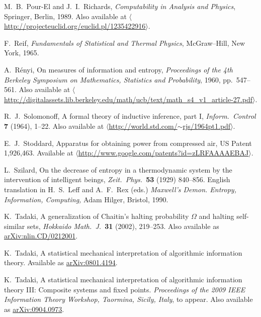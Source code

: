 \documentclass{article}
\begin{document}
\begin{thebibliography}{10}
 M.\ B.\ Pour-El and J.\ I.\ Richards,
\textsl{Computability in Analysis and Physics}, Springer, Berlin, 1989.
Also available at \href{http://projecteuclid.org/euclid.pl/1235422916}
{$\langle$http://projecteuclid.org/euclid.pl/1235422916$\rangle$}.

 F.\ Reif, {\sl Fundamentals of Statistical and
Thermal Physics}, McGraw--Hill, New York, 1965.

 A.\ R\'enyi, On measures of information and entropy,
\textsl{Proceedings of the 4th Berkeley Symposium on Mathematics, 
Statistics and Probability}, 1960, pp.\ 547--561.  Also 
available at
\href{http://digitalassets.lib.berkeley.edu/math/ucb/text/math_s4_v1_article-27.pdf}
{$\langle$http://digitalassets.lib.berkeley.edu/math/ucb/text/math\_s4\_v1\_article-27.pdf$\rangle$}.

 R.\ J.\ Solomonoff, A formal theory of
inductive inference, part I, {\sl Inform.\ Control} {\bf 7} (1964),
1--22.  Also available at 
\hfill \break
\href{http://world.std.com/~rjs/1964pt1.pdf}
{$\langle$http://world.std.com/$\sim$rjs/1964pt1.pdf$\rangle$}.

 E.\ J.\ Stoddard, Apparatus for obtaining 
power from compressed air, US Patent 1,926,463.  Available at 
\hfill \break
\href{http://www.google.com/patents?id=zLRFAAAAEBAJ}
{$\langle$http://www.google.com/patents?id=zLRFAAAAEBAJ$\rangle$}.

 L.\ Szilard, On the decrease of entropy in a
thermodynamic system by the intervention of intelligent beings,
\textsl{Zeit.\ Phys.\ }\textbf{53} (1929) 840--856.
English translation in H.\ S.\ Leff and A.\ F.\ Rex (eds.)
\textit{Maxwell's Demon. Entropy, Information, Computing,} 
Adam Hilger, Bristol, 1990.

 K.\ Tadaki, A generalization of Chaitin's
halting probability $\Omega$ and halting self-similar sets, {\sl
Hokkaido Math.\ J.\ }\textbf{31} (2002), 219--253.  Also available as
\href{http://arxiv.org/abs/nlin.CD/0212001}{arXiv:nlin.CD/0212001}.

 K.\ Tadaki, A statistical mechanical interpretation
of algorithmic information theory.  Available as
\href{http://arxiv.org/abs/0801.4194}{arXiv:0801.4194}.

 K.\ Tadaki, A statistical mechanical interpretation 
of algorithmic information theory III: Composite systems and fixed points.
\textsl{Proceedings of the 2009 IEEE Information Theory Workshop, 
Taormina, Sicily, Italy}, to appear.  Also available as
\href{http://arxiv.org/abs/0904.0973}{arXiv:0904.0973}.

\end{thebibliography}
\end{document}
